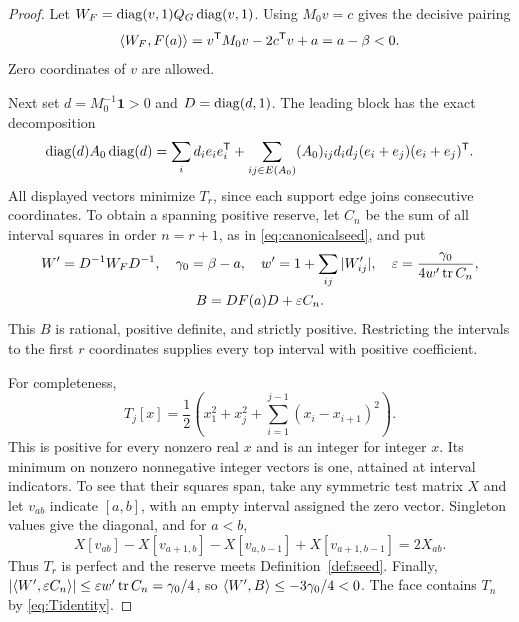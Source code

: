 \begin{proof}
Let $W_F=\operatorname{diag}(v,1)Q_G\operatorname{diag}(v,1)$. Using $M_0v=c$ gives the decisive pairing
\begin{equation}\label{eq:graphwitness}
 \langle W_F,F(a)\rangle=v^{\mathsf T} M_0v-2c^{\mathsf T} v+a=a-\beta<0.
\end{equation}
Zero coordinates of $v$ are allowed.

Next set $d=M_0^{-1}\mathbf1>0$ and $D=\operatorname{diag}(d,1)$. The leading block has the exact decomposition
\begin{equation}\label{eq:normalrealization}
 \operatorname{diag}(d)A_0\operatorname{diag}(d)=
 \sum_i d_i e_ie_i^{\mathsf T}+
 \sum_{ij\in E(A_0)}(A_0)_{ij}d_id_j(e_i+e_j)(e_i+e_j)^{\mathsf T}.
\end{equation}
All displayed vectors minimize $T_r$, since each support edge joins consecutive coordinates. To obtain a spanning positive reserve, let $C_n$ be the sum of all interval squares in order $n=r+1$, as in \eqref{eq:canonicalseed}, and put
\begin{equation}\label{eq:seedassembly}
\begin{gathered}
 W'=D^{-1}W_FD^{-1},\quad \gamma_0=\beta-a,\quad
 w'=1+\sum_{ij}|W'_{ij}|,\quad
 \varepsilon=\frac{\gamma_0}{4w'\operatorname{tr} C_n},\\
 B=DF(a)D+\varepsilon C_n.
\end{gathered}
\end{equation}
This $B$ is rational, positive definite, and strictly positive. Restricting the intervals to the first $r$ coordinates supplies every top interval with positive coefficient.

For completeness,
\begin{equation}\label{eq:Tidentity}
 T_j[x]=\frac12\left(x_1^2+x_j^2+
                 \sum_{i=1}^{j-1}(x_i-x_{i+1})^2\right).
\end{equation}
This is positive for every nonzero real $x$ and is an integer for integer $x$. Its minimum on nonzero nonnegative integer vectors is one, attained at interval indicators. To see that their squares span, take any symmetric test matrix $X$ and let $v_{ab}$ indicate $[a,b]$, with an empty interval assigned the zero vector. Singleton values give the diagonal, and for $a<b$,
\begin{equation}\label{eq:spaninterval}
 X[v_{ab}]-X[v_{a+1,b}]-X[v_{a,b-1}]+X[v_{a+1,b-1}]
 =2X_{ab}.
\end{equation}
Thus $T_r$ is perfect and the reserve meets Definition~\ref{def:seed}. Finally,
$|\langle W',\varepsilon C_n\rangle|\le\varepsilon w'\operatorname{tr} C_n=\gamma_0/4$,
so $\langle W',B\rangle\le-3\gamma_0/4<0$. The face contains $T_n$ by \eqref{eq:Tidentity}.
\end{proof}

